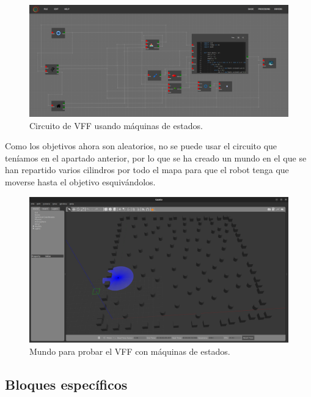 \begin{figure} [H]
    \begin{center}
        \includegraphics[width=13cm]{figs/c6/FSM_circuit.png}
    \end{center}
    \caption[Circuito VFF con FSM]{Circuito de VFF usando máquinas de estados.}
    \label{fig:FSM_circ}
\end{figure}

Como los objetivos ahora son aleatorios, no se puede usar el circuito que teníamos en el apartado anterior, por lo que se ha creado un mundo en el que se han
repartido varios cilindros por todo el mapa para que el robot tenga que moverse hasta el objetivo esquivándolos.

\begin{figure} [H]
    \begin{center}
        \includegraphics[width=13cm]{figs/c6/FSM_world.png}
    \end{center}
    \caption[Mundo VFF con FSM]{Mundo para probar el VFF con máquinas de estados.}
    \label{fig:FSM_world}
\end{figure}

\subsection{Bloques específicos}
\label{subsec:spec_bloques_FSM}

